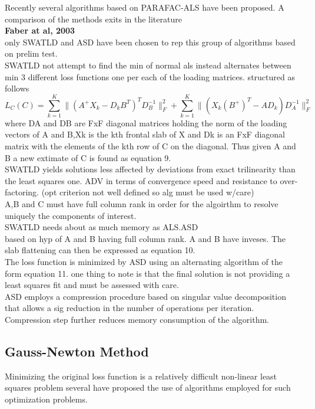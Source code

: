 \documentclass[10pt, draft]{article}
\begin{document}
 Recently several algorithms based on PARAFAC-ALS have been proposed.  A comparison of the methods exits in the literature\\
 \textbf{Faber at al, 2003}\\
 only SWATLD and ASD have been chosen to rep this group of algorithms based on prelim test.\\
 SWATLD not attempt to find the min of normal als instead alternates between min 3 different loss functions one per each of the loading matrices.  structured as follows
 \[ L_C(C) = \sum_{k=1}^K \|(A^+ X_k - D_kB^T)^TD_B^{-1}\|^2_F +  \sum_{k=1}^K \|(X_k(B^+)^T - AD_k)D_A^{-1}\|^2_F\]
 where DA and DB are FxF diagonal matrices holding the norm of the loading vectors of A and B,Xk is the kth frontal slab of X and Dk is an FxF diagonal matrix with the elements of the kth row of C on the diagonal.  Thus given A and B a new extimate of C is found as equation 9.\\
 SWATLD yields solutions less affected by deviations from exact trilinearity than the least squares one. ADV in terms of convergence speed and resistance to over-factoring.  (opt criterion not well defined so alg must be used w/care)\\
 A,B and C must have full column rank in order for the algoirthm to resolve uniquely the components of interest.  \\
 SWATLD needs about as much memory as ALS.\linebreak[1]
 ASD\\
 based on hyp of A and B having full column rank. A and B have inveses. The slab flattening  can then be expressed as equation 10.\\
 The loss function is minimized by ASD using an alternating algorithm of the form equation 11. one thing to note is that the final solution is not providing a least squares fit and must be assessed with care.\\
 ASD employs a compression procedure based on singular value decomposition that allows a sig reduction in the number of operations per iteration. Compression step further reduces memory consumption of the algorithm.  
 
 \subsection{Gauss-Newton Method}
 
 Minimizing the original loss function is a relatively difficult non-linear least squares problem several have proposed the use of algorithms employed for such optimization problems.  \linebreak[1]
 
\end{document}

